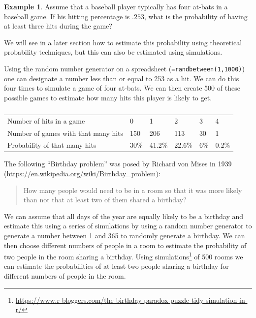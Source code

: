 \documentclass[
]{book}
\theoremstyle{definition}
\theoremstyle{definition}
\newtheorem{example}{Example}[chapter]
\theoremstyle{definition}
\theoremstyle{definition}
\theoremstyle{remark}
\begin{document}
\begin{example}

Assume that a baseball player typically has four at-bats in a baseball game. If his hitting percentage is \(.253\), what is the probability of having at least three hits during the game?

We will see in a later section how to estimate this probability using theoretical probability techniques, but this can also be estimated using simulations.

Using the random number generator on a spreadsheet (\texttt{=randbetween(1,1000)}) one can designate a number less than or equal to 253 as a hit. We can do this four times to simulate a game of four at-bats. We can then create 500 of these possible games to estimate how many hits this player is likely to get.

\begin{table}

\caption{\label{tab:unnamed-chunk-224}}
\centering
\begin{tabular}[t]{llllll}
\toprule
  &  &  &  &  & \\
\midrule
Number of hits in a game & 0 & 1 & 2 & 3 & 4\\
Number of games with that many hits & 150 & 206 & 113 & 30 & 1\\
Probability of that many hits & 30\% & 41.2\% & 22.6\% & 6\% & 0.2\%\\
\bottomrule
\end{tabular}
\end{table}

\end{example}

The following ``Birthday problem'' was posed by Richard von Mises in 1939 (\url{https://en.wikipedia.org/wiki/Birthday_problem}):

\begin{quote}
How many people would need to be in a room so that it was more likely than not that at least two of them shared a birthday?
\end{quote}

We can assume that all days of the year are equally likely to be a birthday and estimate this using a series of simulations by using a random number generator to generate a number between 1 and 365 to randomly generate a birthday. We can then choose different numbers of people in a room to estimate the probability of two people in the room sharing a birthday. Using simulations\footnote{\url{https://www.r-bloggers.com/the-birthday-paradox-puzzle-tidy-simulation-in-r/}} of 500 rooms we can estimate the probabilities of at least two people sharing a birthday for different numbers of people in the room.
\end{document}
